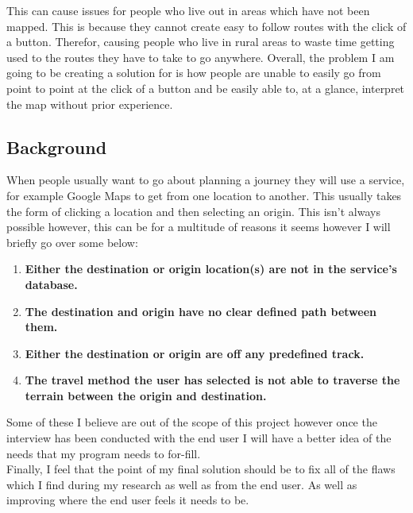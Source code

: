 \begin{FlushLeft}
        This can cause issues for people who live out in areas which have not been mapped. This is because they cannot create easy to follow routes with the click of a button. Therefor, 
        causing people who live in rural areas to waste time getting used to the routes they have to take to go anywhere. Overall, the problem I am going to be creating a solution for is 
        how people are unable to easily go from point to point at the click of a button and be easily able to, at a glance, interpret the map without prior experience. \\

        \subsection{Background}
        \bk
        When people usually want to go about planning a journey they will use a service, for example Google Maps to get from one location to another. This usually takes the form of clicking 
        a location and then selecting an origin. This isn't always possible however, this can be for a multitude of reasons it seems however I will briefly go over some below:\\
        
        \begin{enumerate}
            \item \textbf{Either the destination or origin location(s) are not in the service's database.}
            \item \textbf{The destination and origin have no clear defined path between them.}
            \item \textbf{Either the destination or origin are off any predefined track.}
            \item \textbf{The travel method the user has selected is not able to traverse the terrain between the origin and destination.}
        \end{enumerate}

        \bk
        Some of these I believe are out of the scope of this project however once the interview has been conducted with the end user I will have a better idea of the needs that my program needs to for-fill.\\

        \bk
        Finally, I feel that the point of my final solution should be to fix all of the flaws which I find during my research as well as from the end user. As well as improving where the end user feels it needs to be. \\


\end{FlushLeft}
